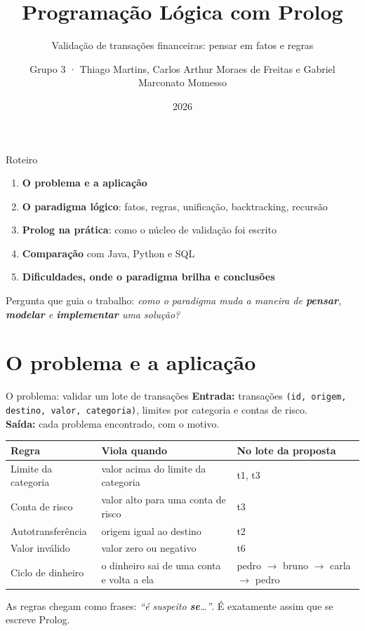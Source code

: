 \documentclass[aspectratio=169,11pt,xcolor=table]{beamer}
\title{Programação Lógica com Prolog}
\subtitle{Validação de transações financeiras: pensar em fatos e regras}
\author{Grupo 3 · Thiago Martins, Carlos Arthur Moraes de Freitas e Gabriel Marconato Momesso}
\institute{Linguagens de Programação}
\date{2026}
\newcommand{\destaque}[1]{%
  \begin{center}\colorbox{accent!10}{\parbox{0.92\linewidth}{\centering\strut #1\strut}}\end{center}}
\begin{document}
\maketitle

\begin{frame}{Roteiro}
  \begin{enumerate}
    \setlength{\itemsep}{6pt}
    \item \textbf{O problema e a aplicação}
    \item \textbf{O paradigma lógico}: fatos, regras, unificação, backtracking, recursão
    \item \textbf{Prolog na prática}: como o núcleo de validação foi escrito
    \item \textbf{Comparação} com Java, Python e SQL
    \item \textbf{Dificuldades, onde o paradigma brilha e conclusões}
  \end{enumerate}
  \vspace{8pt}
  \destaque{Pergunta que guia o trabalho: \emph{como o paradigma muda a maneira de
  \textbf{pensar}, \textbf{modelar} e \textbf{implementar} uma solução?}}
\end{frame}

\section{O problema e a aplicação}

\begin{frame}{O problema: validar um lote de transações}
  \textbf{Entrada:} transações \texttt{(id, origem, destino, valor, categoria)},
  limites por categoria e contas de risco.\\
  \textbf{Saída:} \alert{cada problema encontrado, com o motivo}.
  \vspace{8pt}

  \footnotesize
  \begin{tabularx}{\linewidth}{@{}l Y l@{}}
    \toprule
    \textbf{Regra} & \textbf{Viola quando} & \textbf{No lote da proposta} \\
    \midrule
    Limite da categoria & valor acima do limite da categoria & t1, t3 \\
    Conta de risco & valor alto para uma conta de risco & t3 \\
    Autotransferência & origem igual ao destino & t2 \\
    Valor inválido & valor zero ou negativo & t6 \\
    Ciclo de dinheiro & o dinheiro sai de uma conta e volta a ela &
      pedro $\to$ bruno $\to$ carla $\to$ pedro \\
    \bottomrule
  \end{tabularx}
  \normalsize
  \destaque{As regras chegam como frases: \emph{``é suspeito \textbf{se}\ldots''}.
  É exatamente assim que se escreve Prolog.}
\end{frame}
\end{document}
